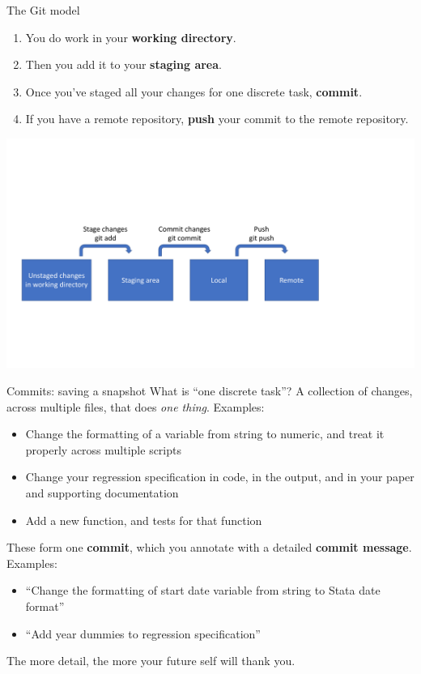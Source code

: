 \documentclass{beamer}
\begin{document}
\begin{frame}{The Git model}

\begin{enumerate}
\item You do work in your \textbf{working directory}.
\item Then you add it to your \textbf{staging area}.
\item Once you've staged all your changes for one discrete task, \textbf{commit}.
\item If you have a remote repository, \textbf{push} your commit to the remote repository.
\end{enumerate}

\includegraphics[width=\textwidth]{git-model.pdf}
\end{frame}


\begin{frame}{Commits: saving a snapshot}
What is ``one discrete task''? A collection of changes, across multiple files, that does \textit{one thing}. Examples:
\begin{itemize}
\item Change the formatting of a variable from string to numeric, and treat it properly across multiple scripts
\item Change your regression specification in code, in the output, and in your paper and supporting documentation
\item Add a new function, and tests for that function
\end{itemize}
These form one \textbf{commit}, which you annotate with a detailed \textbf{commit message}. Examples:
\begin{itemize}
\item ``Change the formatting of start date variable from string to Stata date format''
\item ``Add year dummies to regression specification''
\end{itemize}
The more detail, the more your future self will thank you.
\end{frame}
\end{document}
